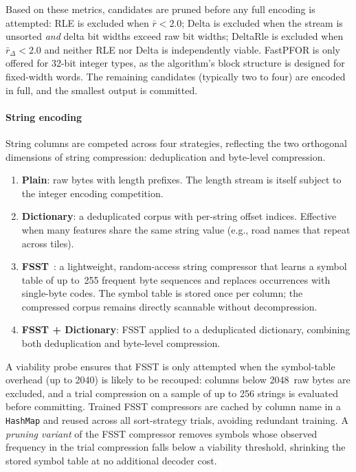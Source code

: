Based on these metrics, candidates are pruned before any full encoding is attempted:
\ac{RLE} is excluded when $\bar{r} < 2.0$;
Delta is excluded when the stream is unsorted \emph{and} delta bit widths exceed raw bit widths;
DeltaRle is excluded when $\bar{r}_\Delta < 2.0$ and neither \ac{RLE} nor Delta is independently viable.
\ac{FastPFOR} is only offered for 32-bit integer types, as the algorithm's block structure is designed for fixed-width words.
The remaining candidates (typically two to four) are encoded in full, and the smallest output is committed.

\paragraph{String encoding}
String columns are competed across four strategies, reflecting the two orthogonal dimensions of string compression: deduplication and byte-level compression.

\begin{enumerate}
    \item \textbf{Plain}: raw bytes with length prefixes.
    The length stream is itself subject to the integer encoding competition.
    \item \textbf{Dictionary}: a deduplicated corpus with per-string offset indices.
    Effective when many features share the same string value (e.g., road names that repeat across tiles).
    \item \textbf{\ac{FSST}}~\cite{bonczFSSTFastRandom2020}: a lightweight, random-access string compressor that learns a symbol table of up to~255 frequent byte sequences and replaces occurrences with single-byte codes.
    The symbol table is stored once per column; the compressed corpus remains directly scannable without decompression.
    \item \textbf{\ac{FSST} + Dictionary}: \ac{FSST} applied to a deduplicated dictionary, combining both deduplication and byte-level compression.
\end{enumerate}

A viability probe ensures that \ac{FSST} is only attempted when the symbol-table overhead (up to \qty{2040}{\byte}) is likely to be recouped: columns below \num{2048}~raw bytes are excluded, and a trial compression on a sample of up to \num{256} strings is evaluated before committing.
Trained \ac{FSST} compressors are cached by column name in a \texttt{HashMap} and reused across all sort-strategy trials, avoiding redundant training.
A \emph{pruning variant} of the \ac{FSST} compressor removes symbols whose observed frequency in the trial compression falls below a viability threshold, shrinking the stored symbol table at no additional decoder cost.

